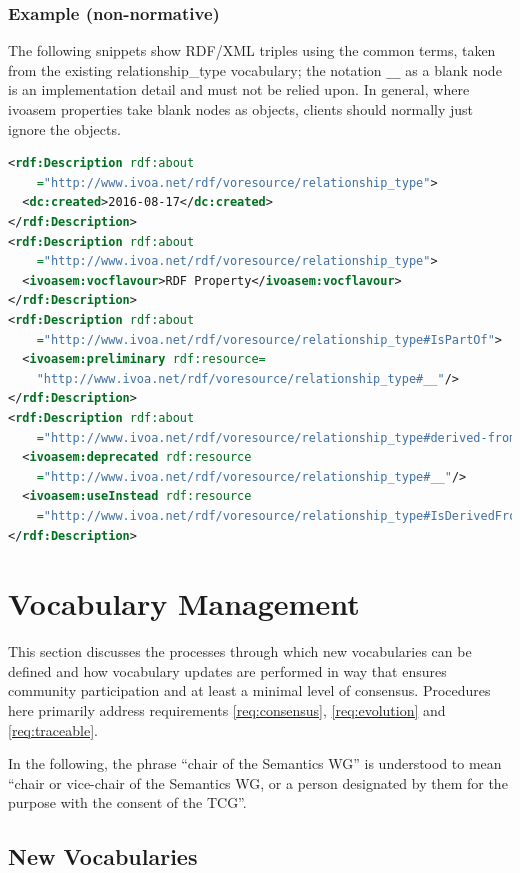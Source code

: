 \documentclass[11pt,a4paper]{ivoa}
\begin{document}
\subsubsection{Example (non-normative)}

The following snippets show RDF/XML triples using the common terms,
taken from the existing relationship\_type vocabulary; the notation
\verb|__| as a blank node is an implementation detail and must not be
relied upon.  In general, where ivoasem properties take blank nodes as
objects, clients should normally just ignore the objects.

\begin{lstlisting}[language=XML]
<rdf:Description rdf:about
    ="http://www.ivoa.net/rdf/voresource/relationship_type">
  <dc:created>2016-08-17</dc:created>
</rdf:Description>
<rdf:Description rdf:about
    ="http://www.ivoa.net/rdf/voresource/relationship_type">
  <ivoasem:vocflavour>RDF Property</ivoasem:vocflavour>
</rdf:Description>
<rdf:Description rdf:about
    ="http://www.ivoa.net/rdf/voresource/relationship_type#IsPartOf">
  <ivoasem:preliminary rdf:resource=
    "http://www.ivoa.net/rdf/voresource/relationship_type#__"/>
</rdf:Description>
<rdf:Description rdf:about
    ="http://www.ivoa.net/rdf/voresource/relationship_type#derived-from">
  <ivoasem:deprecated rdf:resource
    ="http://www.ivoa.net/rdf/voresource/relationship_type#__"/>
  <ivoasem:useInstead rdf:resource
    ="http://www.ivoa.net/rdf/voresource/relationship_type#IsDerivedFrom"/>
</rdf:Description>
\end{lstlisting}


\section{Vocabulary Management}
\label{sect:management}

This section discusses the processes through which new vocabularies can be
defined and how vocabulary updates are performed in way
that ensures community participation and at least a minimal level of
consensus. Procedures here primarily address requirements
\ref{req:consensus}, \ref{req:evolution} and \ref{req:traceable}.

In the following, the phrase ``chair of the Semantics WG'' is understood
to mean ``chair or vice-chair of the Semantics WG, or a person
designated by them for the purpose with the consent of the TCG''.


\subsection{New Vocabularies}
\label{sect:new-vocabularies}
\end{document}
